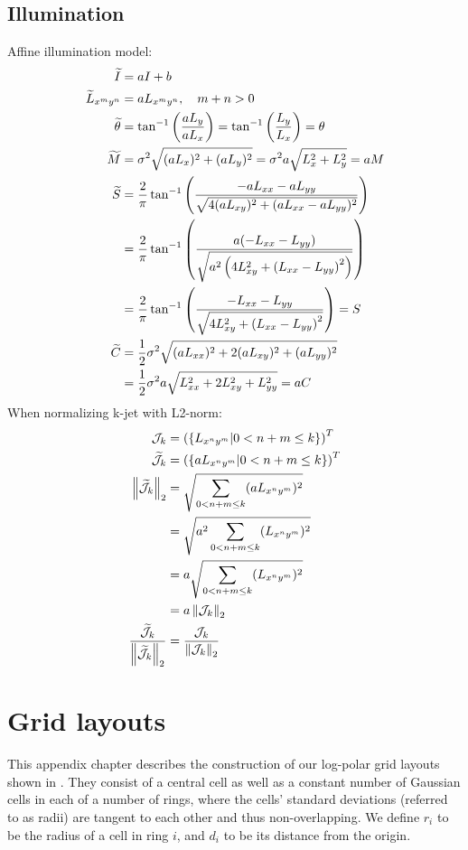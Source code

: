 \documentclass[thesis.tex]{subfiles}
\begin{document}
\section{Illumination} \label{apx:illumination}
%
Affine illumination model:
%
\begin{align*}
  \widetilde{I} &= a I  + b \\
  \widetilde{L}_{x^m y^n} &= a L_{x^m y^n}, \quad m+n > 0 \\
  \widetilde{\theta} &= \tan^{-1} \left( \frac{a L_y}{a L_x} \right) = \tan^{-1} \left( \frac{L_y}{L_x} \right) = \theta \\
  \widetilde{M} &= \sigma^2 \sqrt{(a L_x)^2 + (a L_y)^2} = \sigma^2 a \sqrt{L_x^2 + L_y^2} = a M \\
  \widetilde{S} &= \frac{2}{\pi} \tan^{-1} \left( \frac{-a L_{xx} - a L_{yy}}{\sqrt{4(aL_{xy})^2 + (aL_{xx} - aL_{yy})^2}} \right) \\
  &= \frac{2}{\pi} \tan^{-1} \left( \frac{a (-L_{xx} - L_{yy})}{\sqrt{a^2 \left(4L_{xy}^2 + \left(L_{xx} - L_{yy} \right)^2 \right)}} \right) \\
  &= \frac{2}{\pi} \tan^{-1} \left( \frac{-L_{xx} - L_{yy}}{\sqrt{4L_{xy}^2 + \left(L_{xx} - L_{yy} \right)^2}} \right) = S \\
  \widetilde{C} &= \frac12 \sigma^2 \sqrt{(a L_{xx})^2 + 2 (a L_{xy})^2 + (a L_{yy})^2} \\
  &= \frac12 \sigma^2 a \sqrt{L_{xx}^2 + 2 L_{xy}^2 + L_{yy}^2} = a C
\end{align*}
%
When normalizing k-jet with L2-norm:
%
\begin{align*}
  \mathcal{J}_k &= \left( \left \lbrace L_{x^n y^m} | 0 < n+m \leq k \right \rbrace \right)^T \\
  \widetilde{\mathcal{J}}_k &=\left( \left \lbrace a L_{x^n y^m} | 0 < n+m \leq k \right \rbrace \right)^T \\
  \left \| \widetilde{\mathcal{J}}_k \right \|_2 &= \sqrt{\sum_{0 < n+m \leq k} (a L_{x^n y^m})^2} \\
      &= \sqrt{a^2\sum_{0 < n+m \leq k} (L_{x^n y^m})^2} \\
      &= a\sqrt{\sum_{0 < n+m \leq k} (L_{x^n y^m})^2} \\
      &= a \left \| \mathcal{J}_k \right \|_2 \\
  \frac{\widetilde{\mathcal{J}}_k}{\left \| \widetilde{\mathcal{J}}_k \right \|_2} &=
      \frac{\mathcal{J}_k}{\left \| \mathcal{J}_k \right \|_2}
\end{align*}

\chapter{Grid layouts}
\label{apx:grid_layouts}
%
This appendix chapter describes the construction of our log-polar grid layouts shown in . They consist of a central cell as well as a constant number of Gaussian cells in each of a number of rings, where the cells' standard deviations (referred to as radii) are tangent to each other and thus non-overlapping. We define $r_i$ to be the radius of a cell in ring $i$, and $d_i$ to be its distance from the origin.
%
\end{document}

